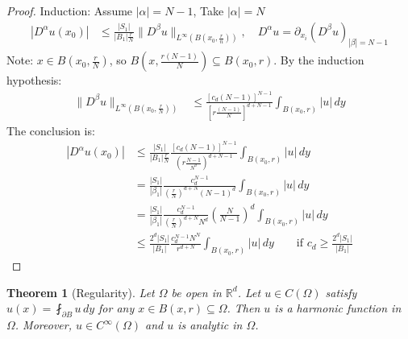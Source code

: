 \documentclass{report}
\theoremstyle{tommy}
\newtheorem{thm}[defn]{Theorem}
\begin{document}
  \begin{proof}
    Induction: Assume \(|\alpha| = N-1\), Take \(|\alpha| = N\)
    \begin{align*}
      |D^\alpha u(x_0)| 
      &\le \frac{|S_1|}{|B_1|\frac{r}{N}} \| D^\beta u \|_{L^\infty (B(x_0, \frac{r}{n}))}, \quad D^\alpha u = \partial_{x_i}(D^\beta u)_{|\beta| = N-1}
    \end{align*}
    Note: \(x \in B(x_0, \frac{r}{N})\), so \(B(x, \frac{r(N-1)}{N}) \subseteq B(x_0, r)\). By the induction hypothesis:
    \begin{align*}
      \|D^\beta u\|_{L^\infty(B(x_0, \frac{r}{N}))} 
      &\le \frac{[c_d (N-1)]^{N-1}}{[r \frac{(N-1)}{N}]^{d+N-1}} \int_{B(x_0, r)} |u| \, dy
    \end{align*}
    The conclusion is:
    \begin{align*}
      |D^\alpha u (x_0)|
      &\le \frac{|S_1|}{|B_1| \frac{r}{N}} \frac{[c_d(N-1)]^{N-1}}{\left(r \frac{N-1}{N^d}\right)^{d + N - 1}} \int_{B(x_0, r)} |u| \, dy \\
      &= \frac{|S_1|}{|\beta_1|} \frac{c_d^{N-1}}{\left(\frac{r}{N}\right)^{d+N} (N-1)^d} \int_{B(x_0, r)} |u| \, dy \\
      &= \frac{|S_1|}{|\beta_1|} \frac{c_d^{N-1}}{\left(\frac{r}{N}\right)^{d+N} N^d} \left(\frac{N}{N-1}\right)^d \int_{B(x_0, r)} |u| \, dy \\
      &\le \frac{2^d |S_1|}{|B_1|} \frac{c_d^{N-1} N^N}{r^{d+N}} \int_{B(x_0, r)} |u| \, dy \qquad \text{if } c_d \ge \frac{2^d |S_1|}{|B_1|}
    \end{align*}
  \end{proof}

  \begin{thm}[Regularity]
    Let \(\Omega\) be open in \(\mathbb{R}^d\). Let \(u \in C(\Omega)\) satisfy \(u(x) = \fint_{\partial B} u \, dy\) for any \(x \in B(x, r) \subseteq \Omega\). Then \(u\) is a harmonic function in \(\Omega\). Moreover, \(u \in C^\infty(\Omega)\) and \(u\) is analytic in \(\Omega\).
  \end{thm}
\end{document}
